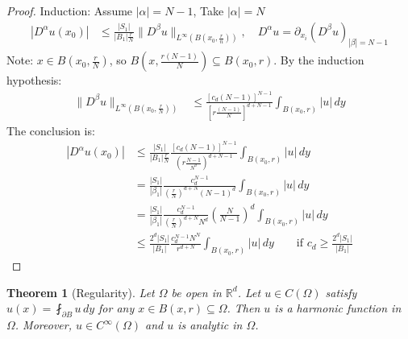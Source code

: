 \documentclass{report}
\theoremstyle{tommy}
\newtheorem{thm}[defn]{Theorem}
\begin{document}
  \begin{proof}
    Induction: Assume \(|\alpha| = N-1\), Take \(|\alpha| = N\)
    \begin{align*}
      |D^\alpha u(x_0)| 
      &\le \frac{|S_1|}{|B_1|\frac{r}{N}} \| D^\beta u \|_{L^\infty (B(x_0, \frac{r}{n}))}, \quad D^\alpha u = \partial_{x_i}(D^\beta u)_{|\beta| = N-1}
    \end{align*}
    Note: \(x \in B(x_0, \frac{r}{N})\), so \(B(x, \frac{r(N-1)}{N}) \subseteq B(x_0, r)\). By the induction hypothesis:
    \begin{align*}
      \|D^\beta u\|_{L^\infty(B(x_0, \frac{r}{N}))} 
      &\le \frac{[c_d (N-1)]^{N-1}}{[r \frac{(N-1)}{N}]^{d+N-1}} \int_{B(x_0, r)} |u| \, dy
    \end{align*}
    The conclusion is:
    \begin{align*}
      |D^\alpha u (x_0)|
      &\le \frac{|S_1|}{|B_1| \frac{r}{N}} \frac{[c_d(N-1)]^{N-1}}{\left(r \frac{N-1}{N^d}\right)^{d + N - 1}} \int_{B(x_0, r)} |u| \, dy \\
      &= \frac{|S_1|}{|\beta_1|} \frac{c_d^{N-1}}{\left(\frac{r}{N}\right)^{d+N} (N-1)^d} \int_{B(x_0, r)} |u| \, dy \\
      &= \frac{|S_1|}{|\beta_1|} \frac{c_d^{N-1}}{\left(\frac{r}{N}\right)^{d+N} N^d} \left(\frac{N}{N-1}\right)^d \int_{B(x_0, r)} |u| \, dy \\
      &\le \frac{2^d |S_1|}{|B_1|} \frac{c_d^{N-1} N^N}{r^{d+N}} \int_{B(x_0, r)} |u| \, dy \qquad \text{if } c_d \ge \frac{2^d |S_1|}{|B_1|}
    \end{align*}
  \end{proof}

  \begin{thm}[Regularity]
    Let \(\Omega\) be open in \(\mathbb{R}^d\). Let \(u \in C(\Omega)\) satisfy \(u(x) = \fint_{\partial B} u \, dy\) for any \(x \in B(x, r) \subseteq \Omega\). Then \(u\) is a harmonic function in \(\Omega\). Moreover, \(u \in C^\infty(\Omega)\) and \(u\) is analytic in \(\Omega\).
  \end{thm}
\end{document}
